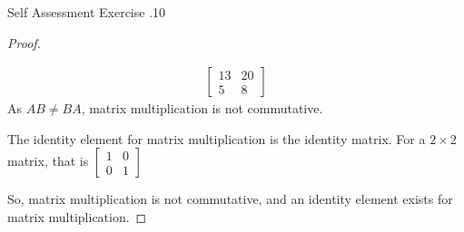 \documentclass[../notes.tex]{subfiles}
\begin{document}
\begin{exercise}{Self Assessment Exercise \thechapter.10}
\begin{enumerate}
\begin{proof}
\begin{subproof}
\begin{align*}
\begin{bmatrix}
											13 & 20\\
											5 & 8
										\end{bmatrix}
									\end{align*}
									As $AB \neq BA$, matrix multiplication is not commutative.
								\end{subproof}
								\begin{subproof}[Identity]
									The identity element for matrix multiplication is the identity matrix. For a $2 \times 2$ matrix, that is $\begin{bmatrix}1 & 0 \\ 0 & 1\end{bmatrix}$
								\end{subproof}
								So, matrix multiplication is not commutative, and an identity element exists for matrix multiplication.
							\end{proof}
					\end{enumerate}
				\end{exercise}
\end{document}
